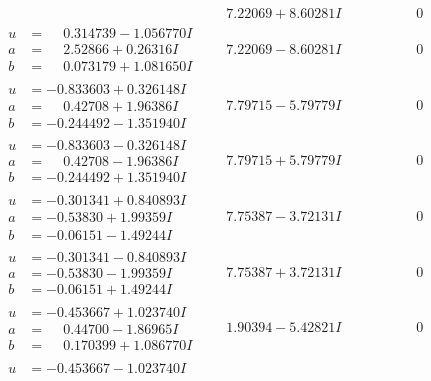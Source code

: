 \documentclass[1p]{elsarticle_modified}
\theoremstyle{definition}
\begin{document}
$$\begin{array}{c|c|c}
 & \phantom{-}7.22069 + 8.60281 I & \phantom{-0.000000 } 0 \\ \hline\begin{aligned}
u &= \phantom{-}0.314739 - 1.056770 I \\
a &= \phantom{-}2.52866 + 0.26316 I \\
b &= \phantom{-}0.073179 + 1.081650 I\end{aligned}
 & \phantom{-}7.22069 - 8.60281 I & \phantom{-0.000000 } 0 \\ \hline\begin{aligned}
u &= -0.833603 + 0.326148 I \\
a &= \phantom{-}0.42708 + 1.96386 I \\
b &= -0.244492 - 1.351940 I\end{aligned}
 & \phantom{-}7.79715 - 5.79779 I & \phantom{-0.000000 } 0 \\ \hline\begin{aligned}
u &= -0.833603 - 0.326148 I \\
a &= \phantom{-}0.42708 - 1.96386 I \\
b &= -0.244492 + 1.351940 I\end{aligned}
 & \phantom{-}7.79715 + 5.79779 I & \phantom{-0.000000 } 0 \\ \hline\begin{aligned}
u &= -0.301341 + 0.840893 I \\
a &= -0.53830 + 1.99359 I \\
b &= -0.06151 - 1.49244 I\end{aligned}
 & \phantom{-}7.75387 - 3.72131 I & \phantom{-0.000000 } 0 \\ \hline\begin{aligned}
u &= -0.301341 - 0.840893 I \\
a &= -0.53830 - 1.99359 I \\
b &= -0.06151 + 1.49244 I\end{aligned}
 & \phantom{-}7.75387 + 3.72131 I & \phantom{-0.000000 } 0 \\ \hline\begin{aligned}
u &= -0.453667 + 1.023740 I \\
a &= \phantom{-}0.44700 - 1.86965 I \\
b &= \phantom{-}0.170399 + 1.086770 I\end{aligned}
 & \phantom{-}1.90394 - 5.42821 I & \phantom{-0.000000 } 0 \\ \hline\begin{aligned}
u &= -0.453667 - 1.023740 I \\

\end{aligned}
\end{array}$$
\end{document}
